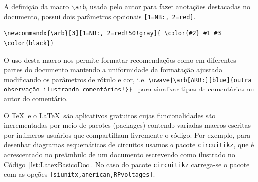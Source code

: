 \begin{example}

A definição da macro \texttt{$\backslash$arb}, usada pelo autor para fazer anotações destacadas no documento, possui dois parâmetros opcionais \texttt{[1=NB:, 2=red]}.
\begin{lstlisting}[language={[Latex]Tex},frame=single,numbers =none]
	\newcommandx{\arb}[3][1=NB:, 2=red!50!gray]{ \color{#2} #1 #3 \color{black}}
\end{lstlisting}
O uso desta macro nos permite formatar recomendações como  
em diferentes partes do documento mantendo a uniformidade da formatação ajustada modificando os parâmetros de rótulo e cor, i.e. \verb|\uwave{\arb[ARB:][blue]{outra observação ilustrando comentários!}}.| para sinalizar tipos de comentários ou autor do comentário. 
\QEDA
\end{example}

O \TeX\,  e o \LaTeX\ são aplicativos gratuitos cujas funcionalidades são incrementadas por meio de pacotes (packages) contendo variadas macros escritas  por inúmeros usuários que compartilham livremente o código. Por exemplo, para desenhar diagramas esquemáticos de circuitos usamos o pacote \texttt{circuitikz}, que é acrescentado no preâmbulo de um documento escrevendo como ilustrado no Código~\ref{lst:LatexBasicoDoc}. No caso do pacote \texttt{circuitikz} carrega-se o pacote com as opções \texttt{[siunitx,american,RPvoltages]}.

